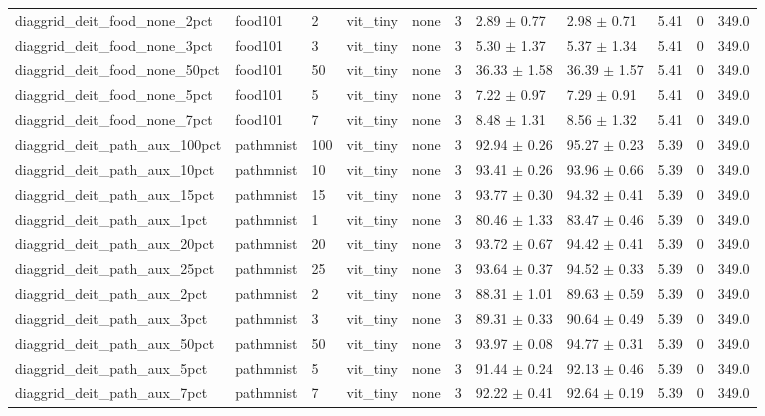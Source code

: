 \begin{tabular}{lllllllllll}
diaggrid_deit_food_none_2pct & food101 & 2 & vit_tiny & none & 3 & 2.89 $\pm$ 0.77 & 2.98 $\pm$ 0.71 & 5.41 & 0 & 349.0 \\
diaggrid_deit_food_none_3pct & food101 & 3 & vit_tiny & none & 3 & 5.30 $\pm$ 1.37 & 5.37 $\pm$ 1.34 & 5.41 & 0 & 349.0 \\
diaggrid_deit_food_none_50pct & food101 & 50 & vit_tiny & none & 3 & 36.33 $\pm$ 1.58 & 36.39 $\pm$ 1.57 & 5.41 & 0 & 349.0 \\
diaggrid_deit_food_none_5pct & food101 & 5 & vit_tiny & none & 3 & 7.22 $\pm$ 0.97 & 7.29 $\pm$ 0.91 & 5.41 & 0 & 349.0 \\
diaggrid_deit_food_none_7pct & food101 & 7 & vit_tiny & none & 3 & 8.48 $\pm$ 1.31 & 8.56 $\pm$ 1.32 & 5.41 & 0 & 349.0 \\
diaggrid_deit_path_aux_100pct & pathmnist & 100 & vit_tiny & none & 3 & 92.94 $\pm$ 0.26 & 95.27 $\pm$ 0.23 & 5.39 & 0 & 349.0 \\
diaggrid_deit_path_aux_10pct & pathmnist & 10 & vit_tiny & none & 3 & 93.41 $\pm$ 0.26 & 93.96 $\pm$ 0.66 & 5.39 & 0 & 349.0 \\
diaggrid_deit_path_aux_15pct & pathmnist & 15 & vit_tiny & none & 3 & 93.77 $\pm$ 0.30 & 94.32 $\pm$ 0.41 & 5.39 & 0 & 349.0 \\
diaggrid_deit_path_aux_1pct & pathmnist & 1 & vit_tiny & none & 3 & 80.46 $\pm$ 1.33 & 83.47 $\pm$ 0.46 & 5.39 & 0 & 349.0 \\
diaggrid_deit_path_aux_20pct & pathmnist & 20 & vit_tiny & none & 3 & 93.72 $\pm$ 0.67 & 94.42 $\pm$ 0.41 & 5.39 & 0 & 349.0 \\
diaggrid_deit_path_aux_25pct & pathmnist & 25 & vit_tiny & none & 3 & 93.64 $\pm$ 0.37 & 94.52 $\pm$ 0.33 & 5.39 & 0 & 349.0 \\
diaggrid_deit_path_aux_2pct & pathmnist & 2 & vit_tiny & none & 3 & 88.31 $\pm$ 1.01 & 89.63 $\pm$ 0.59 & 5.39 & 0 & 349.0 \\
diaggrid_deit_path_aux_3pct & pathmnist & 3 & vit_tiny & none & 3 & 89.31 $\pm$ 0.33 & 90.64 $\pm$ 0.49 & 5.39 & 0 & 349.0 \\
diaggrid_deit_path_aux_50pct & pathmnist & 50 & vit_tiny & none & 3 & 93.97 $\pm$ 0.08 & 94.77 $\pm$ 0.31 & 5.39 & 0 & 349.0 \\
diaggrid_deit_path_aux_5pct & pathmnist & 5 & vit_tiny & none & 3 & 91.44 $\pm$ 0.24 & 92.13 $\pm$ 0.46 & 5.39 & 0 & 349.0 \\
diaggrid_deit_path_aux_7pct & pathmnist & 7 & vit_tiny & none & 3 & 92.22 $\pm$ 0.41 & 92.64 $\pm$ 0.19 & 5.39 & 0 & 349.0 \\

\end{tabular}
